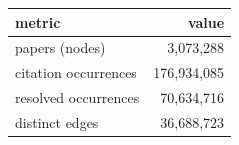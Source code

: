 \begin{tabular}{lr}
\toprule
metric & value \\
\midrule
papers (nodes) & 3,073,288 \\
citation occurrences & 176,934,085 \\
resolved occurrences & 70,634,716 \\
distinct edges & 36,688,723 \\
\bottomrule
\end{tabular}

